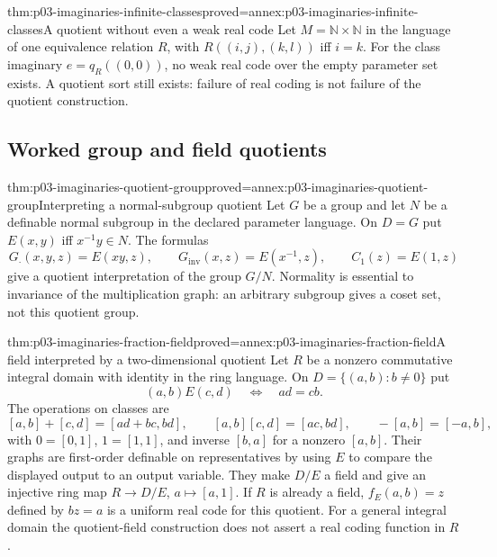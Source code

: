 \begin{hbtheorem}{thm:p03-imaginaries-infinite-classes}{proved=annex:p03-imaginaries-infinite-classes}{A quotient without even a weak real code}
Let \(M=\mathbb N\times\mathbb N\) in the language of one equivalence
relation \(R\), with \(R((i,j),(k,l))\) iff \(i=k\).
For the class imaginary \(e=q_R((0,0))\), no weak real code over the
empty parameter set exists. A quotient sort still exists: failure of real
coding is not failure of the quotient construction.
\end{hbtheorem}

\subsection{Worked group and field quotients}

\begin{hbtheorem}{thm:p03-imaginaries-quotient-group}{proved=annex:p03-imaginaries-quotient-group}{Interpreting a normal-subgroup quotient}
Let \(G\) be a group and let \(N\) be a definable normal subgroup in
the declared parameter language. On \(D=G\) put
\(E(x,y)\) iff \(x^{-1}y\in N\). The formulas
\[
 G_{\cdot}(x,y,z)=E(xy,z),\qquad
 G_{\mathrm{inv}}(x,z)=E(x^{-1},z),\qquad C_1(z)=E(1,z)
\]
give a quotient interpretation of the group \(G/N\).
Normality is essential to invariance of the multiplication graph: an arbitrary
subgroup gives a coset set, not this quotient group.
\end{hbtheorem}

\begin{hbtheorem}{thm:p03-imaginaries-fraction-field}{proved=annex:p03-imaginaries-fraction-field}{A field interpreted by a two-dimensional quotient}
Let \(R\) be a nonzero commutative integral domain with identity in the
ring language. On \(D=\{(a,b):b\ne0\}\) put
\[
        (a,b)E(c,d)\quad\Longleftrightarrow\quad ad=cb.
\]
The operations on classes are
\[
 [a,b]+[c,d]=[ad+bc,bd],\qquad
 [a,b][c,d]=[ac,bd],\qquad -[a,b]=[-a,b],
\]
with \(0=[0,1]\), \(1=[1,1]\), and inverse \([b,a]\) for a nonzero
\([a,b]\). Their graphs are first-order definable on representatives by
using \(E\) to compare the displayed output to an output variable.
They make \(D/E\) a field and give an injective ring map
\(R\to D/E\), \(a\mapsto[a,1]\).
If \(R\) is already a field, \(f_E(a,b)=z\) defined by \(bz=a\)
is a uniform real code for this quotient. For a general integral domain the
quotient-field construction does not assert a real coding function in \(R\).
\end{hbtheorem}

